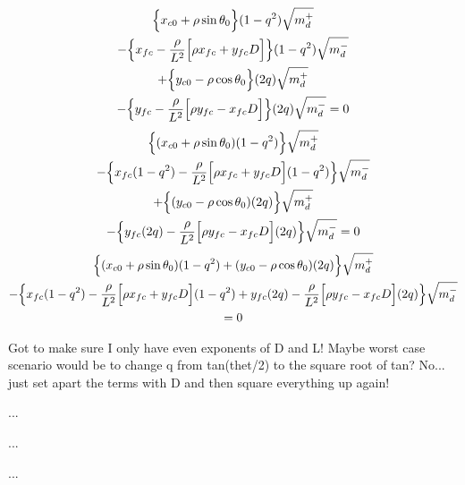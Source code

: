 \documentclass[12pt]{article}
\begin{document}
\begin{gather}
    \Bigl\{ x_{c0} +\rho\sin\theta_0 \Bigr\}(1-q^2)\sqrt{m_d^+} \nonumber\\
    - \Bigl\{ x_{fc} -\frac{\rho}{L^2}\Bigl[\rho x_{fc} + y_{fc}D\Bigr] \Bigr\}(1-q^2) \sqrt{m_d^-} \nonumber\\
    + \Big\{y_{c0} - \rho\cos\theta_0 \Bigr\}(2q)\sqrt{m_d^+} \nonumber\\
    - \Bigl\{ y_{fc} -\frac{\rho}{L^2}\Bigl[\rho y_{fc} - x_{fc}D\Bigr] \Bigr\}(2q) \sqrt{m_d^-} = 0
\end{gather}
\begin{gather}
    \Bigl\{ (x_{c0} +\rho\sin\theta_0)(1-q^2) \Bigr\}\sqrt{m_d^+} \nonumber\\
    - \Bigl\{ x_{fc}(1-q^2) -\frac{\rho}{L^2}\Bigl[\rho x_{fc} + y_{fc}D\Bigr](1-q^2) \Bigr\} \sqrt{m_d^-} \nonumber\\
    + \Big\{(y_{c0} - \rho\cos\theta_0)(2q) \Bigr\}\sqrt{m_d^+} \nonumber\\
    - \Bigl\{ y_{fc}(2q) -\frac{\rho}{L^2}\Bigl[\rho y_{fc} - x_{fc}D\Bigr](2q) \Bigr\} \sqrt{m_d^-} = 0
\end{gather}
\begin{gather}
    \Bigl\{ (x_{c0} +\rho\sin\theta_0)(1-q^2) + (y_{c0} - \rho\cos\theta_0)(2q) \Bigr\}\sqrt{m_d^+} \nonumber\\
    - \Bigl\{ x_{fc}(1-q^2) -\frac{\rho}{L^2}\Bigl[\rho x_{fc} + y_{fc}D\Bigr](1-q^2) + y_{fc}(2q) -\frac{\rho}{L^2}\Bigl[\rho y_{fc} - x_{fc}D\Bigr](2q) \Bigr\} \sqrt{m_d^-} \nonumber\\ = 0
\end{gather}

Got to make sure I only have even exponents of D and L! Maybe worst case scenario would be to change q from tan(thet/2) to the square root of tan? No... just set apart the terms with D and then square everything up again!

...

...

...
\end{document}
